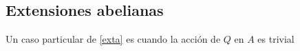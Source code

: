 \subsection{Extensiones abelianas}

Un caso particular de \eqref{exta} es cuando la acción de $Q$ en $A$ es trivial
